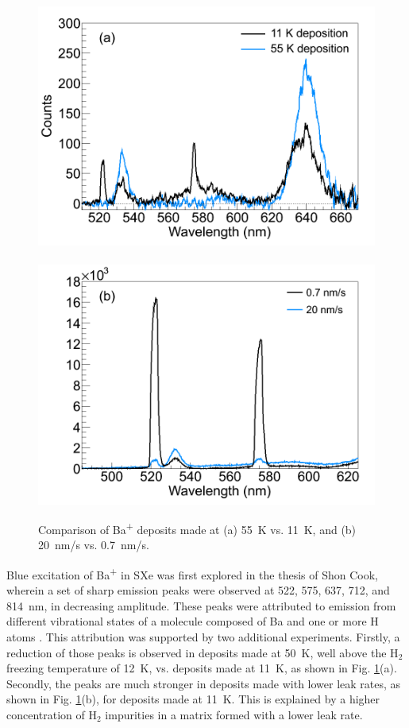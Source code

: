 \begin{figure} %
        \centering
                \includegraphics[width=.5\textwidth]{figures/BaHx_a.png}
                ~
                \includegraphics[width=.5\textwidth]{figures/BaHx_b.png}
                \caption{Comparison of Ba\textsuperscript{+} deposits made at (a) 55~K vs. 11~K, and (b) 20~nm/s vs. 0.7~nm/s.\cite{Mong2015}}
\label{fig:BaHx}
\end{figure}


Blue excitation of Ba\textsuperscript{+} in SXe was first explored in the thesis of Shon Cook, wherein a set of sharp emission peaks were observed at 522, 575, 637, 712, and 814~nm, in decreasing amplitude.  These peaks were attributed to emission from different vibrational states of a molecule composed of Ba and one or more H atoms \cite{Shon}.  This attribution was supported by two additional experiments.  Firstly, a reduction of those peaks is observed in deposits made at 50~K, well above the H$_{2}$ freezing temperature of 12~K, vs. deposits made at 11~K, as shown in Fig. \ref{fig:BaHx}(a).  Secondly, the peaks are much stronger in deposits made with lower leak rates, as shown in Fig. \ref{fig:BaHx}(b), for deposits made at 11~K.  This is explained by a higher concentration of H$_{2}$ impurities in a matrix formed with a lower leak rate.

